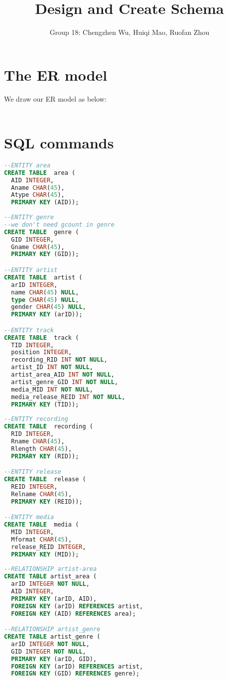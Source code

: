 \documentclass[11pt]{article} %
\title{Design and Create Schema}
\author{Group 18: Chengzhen Wu, Huiqi Mao, Ruofan Zhou}
\begin{document}
\maketitle

\section{The ER model}
We draw our ER model as below:
\\
\\

\section{SQL commands}
\begin{lstlisting}[language=SQL, keywordstyle=\color{blue!70},
commentstyle=\color{red!50!green!50!blue!50},
rulesepcolor=\color{red!20!green!20!blue!20},
frame=shadowbox]
--ENTITY area
CREATE TABLE  area (
  AID INTEGER,
  Aname CHAR(45),
  Atype CHAR(45),
  PRIMARY KEY (AID));
  
--ENTITY genre
--we don't need gcount in genre
CREATE TABLE  genre (
  GID INTEGER,
  Gname CHAR(45),
  PRIMARY KEY (GID));

--ENTITY artist
CREATE TABLE  artist (
  arID INTEGER,
  name CHAR(45) NULL,
  type CHAR(45) NULL,
  gender CHAR(45) NULL,
  PRIMARY KEY (arID));

--ENTITY track
CREATE TABLE  track (
  TID INTEGER,
  position INTEGER,
  recording_RID INT NOT NULL,
  artist_ID INT NOT NULL,
  artist_area_AID INT NOT NULL,
  artist_genre_GID INT NOT NULL,
  media_MID INT NOT NULL,
  media_release_REID INT NOT NULL,
  PRIMARY KEY (TID));
  
--ENTITY recording
CREATE TABLE  recording (
  RID INTEGER,
  Rname CHAR(45),
  Rlength CHAR(45),
  PRIMARY KEY (RID));

--ENTITY release
CREATE TABLE  release (
  REID INTEGER,
  Relname CHAR(45),
  PRIMARY KEY (REID));

--ENTITY media
CREATE TABLE  media (
  MID INTEGER,
  Mformat CHAR(45),
  release_REID INTEGER,
  PRIMARY KEY (MID));
    
--RELATIONSHIP artist-area
CREATE TABLE artist_area (
  arID INTEGER NOT NULL,
  AID INTEGER,
  PRIMARY KEY (arID, AID),
  FOREIGN KEY (arID) REFERENCES artist,
  FOREIGN KEY (AID) REFERENCES area);

--RELATIONSHIP artist_genre
CREATE TABLE artist_genre (
  arID INTEGER NOT NULL,
  GID INTEGER NOT NULL,
  PRIMARY KEY (arID, GID),
  FOREIGN KEY (arID) REFERENCES artist,
  FOREIGN KEY (GID) REFERENCES genre);
    

\end{lstlisting}
\end{document}
